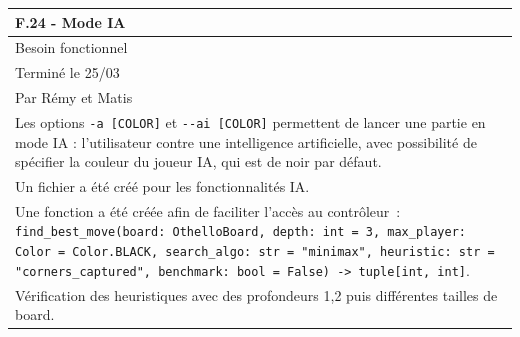 \documentclass[a4paper,12pt]{article}
\begin{document}
\begin{tabularx}{\textwidth}{|X|}
    \hline
    \textbf{F.24 - Mode IA}                                                                                                                                                                                                                                                               \\
    \hline
    Besoin fonctionnel                                                                                                                                                                                                                                                                    \\
    \hline
    Terminé le 25/03                                                                                                                                                                                                                                                                      \\
    Par Rémy et Matis                                                                                                                                                                                                                                                                     \\
    \hline
    Les options \texttt{-a [COLOR]} et \texttt{-}\texttt{-ai [COLOR]} permettent de lancer une partie en mode IA : l’utilisateur contre une intelligence artificielle, avec possibilité de spécifier la couleur du joueur IA, qui est de noir par défaut.                                 \\
    Un fichier a été créé pour les fonctionnalités IA.                                                                                                                                                                                                                                    \\
    Une fonction a été créée afin de faciliter l'accès au contrôleur~: \texttt{find\_best\_move(board: OthelloBoard, depth: int = 3, max\_player: Color = Color.BLACK, search\_algo: str = "minimax", heuristic: str = "corners\_captured", benchmark: bool = False) -> tuple[int, int]}. \\
    \arrayrulecolor{MediumAquamarine}\hline
    \arrayrulecolor{CornflowerBlue}
    Vérification des heuristiques avec des profondeurs 1,2 puis différentes tailles de board.                                                                                                                                                                                             \\

\end{tabularx}
\end{document}
